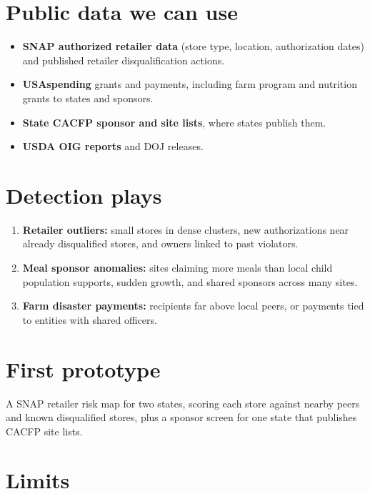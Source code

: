 \documentclass[letterpaper,11pt]{article}
\providecommand{\tightlist}{\setlength{\itemsep}{0pt}\setlength{\parskip}{0pt}}
\begin{document}
\hypertarget{public-data-we-can-use}{%
\section{Public data we can use}\label{public-data-we-can-use}}

\begin{itemize}
\tightlist
\item
  \textbf{SNAP authorized retailer data} (store type, location,
  authorization dates) and published retailer disqualification actions.
\item
  \textbf{USAspending} grants and payments, including farm program and
  nutrition grants to states and sponsors.
\item
  \textbf{State CACFP sponsor and site lists}, where states publish
  them.
\item
  \textbf{USDA OIG reports} and DOJ releases.
\end{itemize}

\hypertarget{detection-plays}{%
\section{Detection plays}\label{detection-plays}}

\begin{enumerate}
\def\labelenumi{\arabic{enumi}.}
\tightlist
\item
  \textbf{Retailer outliers:} small stores in dense clusters, new
  authorizations near already disqualified stores, and owners linked to
  past violators.
\item
  \textbf{Meal sponsor anomalies:} sites claiming more meals than local
  child population supports, sudden growth, and shared sponsors across
  many sites.
\item
  \textbf{Farm disaster payments:} recipients far above local peers, or
  payments tied to entities with shared officers.
\end{enumerate}

\hypertarget{first-prototype}{%
\section{First prototype}\label{first-prototype}}

A SNAP retailer risk map for two states, scoring each store against
nearby peers and known disqualified stores, plus a sponsor screen for
one state that publishes CACFP site lists.

\hypertarget{limits}{%
\section{Limits}\label{limits}}
\end{document}
